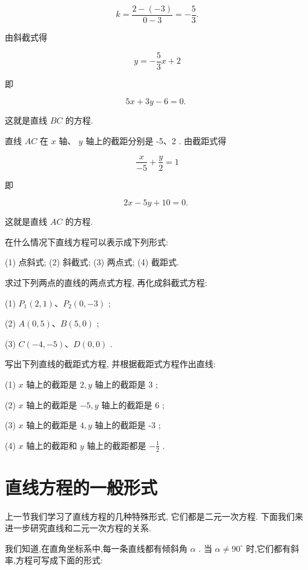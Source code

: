 \documentclass[lang=cn,newtx,10pt,scheme=chinese]{elegantbook}
\begin{document}
\[
  k = \frac{2 - \left( {-3}\right) }{0 - 3} = - \frac{5}{3}.
\]

由斜截式得

\[
  y = - \frac{5}{3}x + 2
\]

即

\[
    {5x} + {3y} - 6 = 0\text{. }
\]

这就是直线 \({BC}\) 的方程.

直线 \({AC}\) 在 \(x\) 轴、 \(y\) 轴上的截距分别是 -5、2 . 由截距式得

\[
  \frac{x}{-5} + \frac{y}{2} = 1
\]

即

\[
    {2x} - {5y} + {10} = 0\text{. }
\]

这就是直线 \({AC}\) 的方程.

\begin{problemset}[练习]

\item 在什么情况下直线方程可以表示成下列形式:

(1) 点斜式; (2) 斜截式; (3) 两点式; (4) 截距式.

\item 求过下列两点的直线的两点式方程, 再化成斜截式方程:

(1) \({P}_{1}\left( {2,1}\right) \text{、}{P}_{2}\left( {0, - 3}\right)\) ;

(2) \(A\left( {0,5}\right) \text{、}B\left( {5,0}\right)\) ;

(3) \(C\left( {-4, - 5}\right) \text{、}D\left( {0,0}\right)\) .

\item 写出下列直线的截距式方程, 并根据截距式方程作出直线:

(1) \(x\) 轴上的截距是 \(2,y\) 轴上的截距是 3 ;

(2) \(x\) 轴上的截距是 \(- 5,y\) 轴上的截距是 6 ;

(3) \(x\) 轴上的截距是 \(4,y\) 轴上的截距是 -3 ;

(4) \(x\) 轴上的截距和 \(y\) 轴上的截距都是 \(- \frac{1}{2}\) .
\end{problemset}

\section{直线方程的一般形式}

上一节我们学习了直线方程的几种特殊形式, 它们都是二元一次方程. 下面我们来进一步研究直线和二元一次方程的关系.

我们知道,在直角坐标系中,每一条直线都有倾斜角 \(\alpha\) . 当 \(\alpha \neq {90}^{ \circ }\) 时,它们都有斜率,方程可写成下面的形式:
\end{document}
